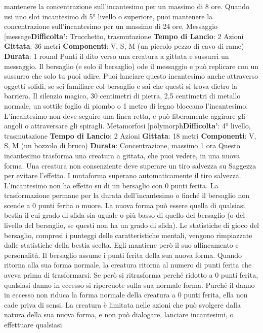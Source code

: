 \begin{multicols}{2}
mantenere la concentrazione sull’incantesimo per un
massimo di 8 ore. Quando usi uno slot incantesimo di
5° livello o superiore, puoi mantenere la concentrazione
sull’incantesimo per un massimo di 24 ore.
Messaggio
[message\textbf{Difficolta'}:
Trucchetto, trasmutazione
\textbf{Tempo di Lancio}: 2 Azioni
\textbf{Gittata}: 36 metri
\textbf{Componenti}: V, S, M (un piccolo pezzo di cavo di
rame)
\textbf{Durata}: 1 round
Punti il dito verso una creatura a gittata e sussurri un
messaggio. Il bersaglio (e solo il bersaglio) ode il
messaggio e può replicare con un sussurro che solo tu
puoi udire.
Puoi lanciare questo incantesimo anche attraverso
oggetti solidi, se sei familiare col bersaglio e sai che
questi si trova dietro la barriera. Il silenzio magico, 30
centimetri di pietra, 2,5 centimetri di metallo normale,
un sottile foglio di piombo o 1 metro di legno bloccano
l’incantesimo. L’incantesimo non deve seguire una linea
retta, e può liberamente aggirare gli angoli o
attraversare gli spiragli.
Metamorfosi
[polymorph\textbf{Difficolta'}:
4° livello, trasmutazione
\textbf{Tempo di Lancio}: 2 Azioni
\textbf{Gittata}: 18 metri
\textbf{Componenti}: V, S, M (un bozzolo di bruco)
\textbf{Durata}: Concentrazione, massimo 1 ora
Questo incantesimo trasforma una creatura a gittata,
che puoi vedere, in una nuova forma. Una creatura non
consenziente deve superare un tiro salvezza su
Saggezza per evitare l’effetto. I mutaforma superano
automaticamente il tiro salvezza. L’incantesimo non ha
effetto su di un bersaglio con 0 punti ferita.
La trasformazione permane per la durata
dell’incantesimo o finché il bersaglio non scende a 0
punti ferita o muore. La nuova forma può essere quella
di qualsiasi bestia il cui grado di sfida sia uguale o più
basso di quello del bersaglio (o del livello del bersaglio,
se questi non ha un grado di sfida). Le statistiche di
gioco del bersaglio, compresi i punteggi delle
caratteristiche mentali, vengono rimpiazzate dalle 
statistiche della bestia scelta. Egli mantiene però il suo
allineamento e personalità.
Il bersaglio assume i punti ferita della sua nuova forma.
Quando ritorna alla sua forma normale, la creatura
ritorna al numero di punti ferita che aveva prima di
trasformarsi. Se però si ritrasforma perché ridotto a 0
punti ferita, qualsiasi danno in eccesso si ripercuote
sulla sua normale forma. Purché il danno in eccesso
non riduca la forma normale della creatura a 0 punti
ferita, ella non cade priva di sensi.
La creatura è limitata nelle azioni che può svolgere
dalla natura della sua nuova forma, e non può
dialogare, lanciare incantesimi, o effettuare qualsiasi

\end{multicols}
